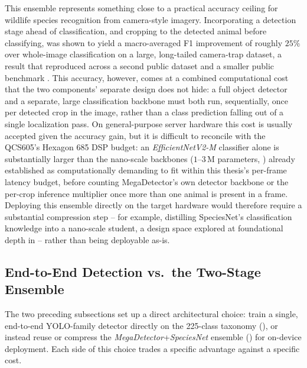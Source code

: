 This ensemble represents something close to a practical accuracy ceiling for wildlife species recognition from camera-style imagery. Incorporating a detection stage ahead of classification, and cropping to the detected animal before classifying, was shown to yield a macro-averaged F1 improvement of roughly $25\%$ over whole-image classification on a large, long-tailed camera-trap dataset, a result that reproduced across a second public dataset and a smaller public benchmark \cite{gadotCropNotCrop2024}. This accuracy, however, comes at a combined computational cost that the two components' separate design does not hide: a full object detector and a separate, large classification backbone must both run, sequentially, once per detected crop in the image, rather than a class prediction falling out of a single localization pass. On general-purpose server hardware this cost is usually accepted given the accuracy gain, but it is difficult to reconcile with the QCS605's Hexagon 685 DSP budget: an \textit{EfficientNetV2-M} classifier alone is substantially larger than the nano-scale backbones ($1$--$3\,\mathrm{M}$ parameters, ) already established as computationally demanding to fit within this thesis's per-frame latency budget, before counting MegaDetector's own detector backbone or the per-crop inference multiplier once more than one animal is present in a frame. Deploying this ensemble directly on the target hardware would therefore require a substantial compression step -- for example, distilling SpeciesNet's classification knowledge into a nano-scale student, a design space explored at foundational depth in  -- rather than being deployable as-is.

\subsection{End-to-End Detection vs.\ the Two-Stage Ensemble}\label{sec:lit_yolo_vs_ensemble}

The two preceding subsections set up a direct architectural choice: train a single, end-to-end YOLO-family detector directly on the 225-class taxonomy (), or instead reuse or compress the \textit{MegaDetector}+\textit{SpeciesNet} ensemble () for on-device deployment. Each side of this choice trades a specific advantage against a specific cost.


